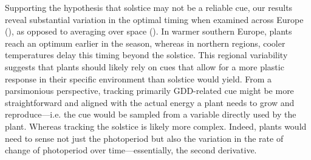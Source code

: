 \documentclass[11pt,letter]{article}
\begin{document}
Supporting the hypothesis that solstice may not be a reliable cue, our results reveal substantial variation in the optimal timing when examined across Europe (), as opposed to averaging over space (). In warmer southern Europe, plants reach an optimum earlier in the season, whereas in northern regions, cooler temperatures delay this timing beyond the solstice. 
This regional variability suggests that plants should likely 
rely on cues that allow for a more plastic response in their specific environment than solstice would yield. 
From a parsimonious perspective, tracking primarily GDD-related cue might be more straightforward and aligned with the actual energy a plant needs to grow and reproduce---i.e. the cue would be sampled from a variable directly used by the plant.
Whereas tracking the solstice is likely more complex. Indeed, plants would need to sense not just the photoperiod but also the variation in the rate of change of photoperiod over time---essentially, the second derivative.
\end{document}
